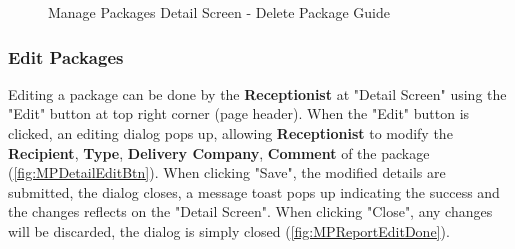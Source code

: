 \begin{figure}[H]
	\centering
    \vspace{5pt}
  
    \vspace{10pt}
  
    \vspace{10pt}
    \caption{Manage Packages Detail Screen - Delete Package Guide}
	\label{fig:MPDetailDeleteGuide}
\end{figure}

\subsubsection{Edit Packages}
\label{subsubsec:MPedit}

Editing a package can be done by the \textbf{Receptionist} at "Detail Screen" using the "Edit" button at top right corner (page header).
When the "Edit" button is clicked, an editing dialog pops up, allowing \textbf{Receptionist} to modify the \textbf{Recipient}, \textbf{Type}, \textbf{Delivery Company}, \textbf{Comment} of the package (\autoref{fig:MPDetailEditBtn}). 
When clicking "Save", the modified details are submitted, the dialog closes, a message toast pops up indicating the success and the changes reflects on the "Detail Screen". When clicking "Close", any changes will be discarded, the dialog is simply closed (\autoref{fig:MPReportEditDone}).

